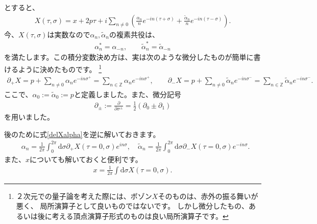 \documentclass[report,paper=a4, fontsize=12pt, line_length=16cm, number_of_lines=34,dvipdfmx]{jlreq}
\numberwithin{equation}{chapter}
\numberwithin{equation}{section}
\newcommand{\Zb}{\mathbb{Z}}
\newcommand{\del}{\partial}
\newcommand{\alphat}{\tilde{\alpha}}
\newcommand{\di}{\mathrm{d}}
\begin{document}
とすると、
\begin{align}
X(\tau,\sigma)=x+2p\tau+i\sum_{n\ne 0}\left(
\frac{\alpha_n}{n}e^{-in(\tau+\sigma)}
+\frac{\alphat_n}{n}e^{-in(\tau-\sigma)}
\right).
\end{align}
今、$X(\tau,\sigma)$は実数なので$\alpha_n,\alphat_n$の複素共役は、
\begin{align}
\alpha_n^{*}=\alpha_{-n},\qquad
\alphat_n^{*}=\alphat_{-n}
\end{align}
を満たします。この積分変数決め方は、実は次のような微分したものが簡単に書けるように決めたものです。
\footnote{２次元での量子論を考えた際には、ボゾン$X$そのものは、赤外の振る舞いが悪く、
局所演算子として良いものではないです。
しかし微分したもの、あるいは後に考える頂点演算子形式のものは良い局所演算子です。}
\begin{align}
\del_{+}X
=p+\sum_{n\ne 0} \alpha_n e^{-in\sigma^{+}}
=\sum_{n \in \Zb} \alpha_n e^{-in\sigma^{+}}
,\qquad
\del_{-}X
=p+\sum_{n\ne 0} \alphat_n e^{-in\sigma^{-}}
=\sum_{n \in \Zb} \alphat_n e^{-in\sigma^{-}}.
\label{delXalpha}
\end{align}
ここで、$\alpha_0:=\alphat_0:=p$と定義しました。また、微分記号
\begin{align}
\del_{\pm}:=\frac{\del}{\del \sigma^{\pm}} =\frac12 (\del_0 \pm \del_1)
\end{align}
を用いました。

後のために式\eqref{delXalpha}を逆に解いておきます。
\begin{align}
&\alpha_n=\frac{1}{2\pi}\int_0^{2\pi} \di \sigma \del_{+} X(\tau=0,\sigma) e^{in\sigma}, \quad
\alphat_n=\frac{1}{2\pi}\int_0^{2\pi} \di \sigma \del_{-} X(\tau=0,\sigma) e^{-in\sigma}.\label{alphabyX}
\end{align}
また、$x$についても解いておくと便利です。
\begin{align}
x=\frac{1}{2\pi}\int \di\sigma X(\tau=0,\sigma).\label{xbyX}
\end{align}
\end{document}
